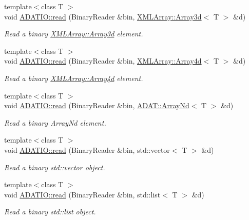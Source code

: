 \begin{DoxyCompactItemize}
{\footnotesize template$<$class T $>$ }\\void \mbox{\hyperlink{namespaceADATIO_ac8f475cc894abb16b89f3e73e1132bce}{A\+D\+A\+T\+I\+O\+::read}} (Binary\+Reader \&bin, \mbox{\hyperlink{classXMLArray_1_1Array3d}{X\+M\+L\+Array\+::\+Array3d}}$<$ T $>$ \&d)
\begin{DoxyCompactList}\small\item\em Read a binary \mbox{\hyperlink{classXMLArray_1_1Array3d}{X\+M\+L\+Array\+::\+Array3d}} element. \end{DoxyCompactList}\item 
{\footnotesize template$<$class T $>$ }\\void \mbox{\hyperlink{namespaceADATIO_a0e3333d0774c69f2c6a38b013e23d02b}{A\+D\+A\+T\+I\+O\+::read}} (Binary\+Reader \&bin, \mbox{\hyperlink{classXMLArray_1_1Array4d}{X\+M\+L\+Array\+::\+Array4d}}$<$ T $>$ \&d)
\begin{DoxyCompactList}\small\item\em Read a binary \mbox{\hyperlink{classXMLArray_1_1Array4d}{X\+M\+L\+Array\+::\+Array4d}} element. \end{DoxyCompactList}\item 
{\footnotesize template$<$class T $>$ }\\void \mbox{\hyperlink{namespaceADATIO_a0b5c3397d644a4f522e7b097825986cb}{A\+D\+A\+T\+I\+O\+::read}} (Binary\+Reader \&bin, \mbox{\hyperlink{classADAT_1_1ArrayNd}{A\+D\+A\+T\+::\+Array\+Nd}}$<$ T $>$ \&d)
\begin{DoxyCompactList}\small\item\em Read a binary Array\+Nd element. \end{DoxyCompactList}\item 
{\footnotesize template$<$class T $>$ }\\void \mbox{\hyperlink{namespaceADATIO_a6f8814a83922a0b41bf9a25627b5dcfd}{A\+D\+A\+T\+I\+O\+::read}} (Binary\+Reader \&bin, std\+::vector$<$ T $>$ \&d)
\begin{DoxyCompactList}\small\item\em Read a binary std\+::vector object. \end{DoxyCompactList}\item 
{\footnotesize template$<$class T $>$ }\\void \mbox{\hyperlink{namespaceADATIO_a6b74b694d784ffa233957d276d10528d}{A\+D\+A\+T\+I\+O\+::read}} (Binary\+Reader \&bin, std\+::list$<$ T $>$ \&d)
\begin{DoxyCompactList}\small\item\em Read a binary std\+::list object. \end{DoxyCompactList}\item 

\end{DoxyCompactItemize}
